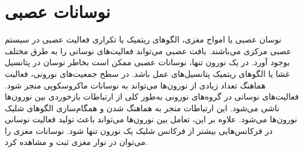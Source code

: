 \section{نوسانات عصبی}
نوسان عصبی یا امواج مغزی، الگوهای ریتمیک یا تکراری فعالیت عصبی در سیستم عصبی مرکزی می‌باشند. بافت عصبی می‌تواند فعالیت‌های نوسانی را به طرق مختلف بوجود آورد.
 در یک نورون‌ تنها، نوسانات عصبی ممکن است بخاطر نوسان در پتانسیل غشا یا الگوهای ریتمیک پتانسیل‌های عمل
  باشد. در سطح جمعیت‌های نورونی، فعالیت هماهنگ تعداد زیادی از نورون‌ها می‌تواند به نوسانات ماکروسکوپی منجر شود. فعالیت‌های نوسانی در گروه‌های نورونی به‌طور کلی از ارتباطات بازخوردی بین نورون‌ها ناشی می‌شود. این ارتباطات منجر به هماهنگ شدن و همگام‌سازی الگوهای شلیک نورون‌ها می‌شود. علاوه بر این، تعامل بین نورون‌ها می‌تواند باعث تولید فعالیت نوسانی در فرکانس‌هایی بیشتر از فرکانس شلیک یک نورون‌ تنها شود. نوسانات مغزی را می‌توان در نوار مغزی
ثبت و مشاهده کرد.
  
